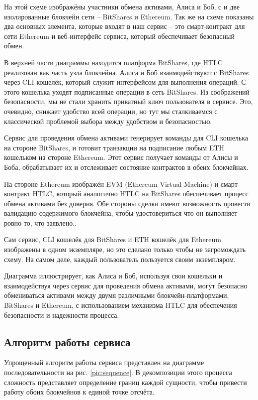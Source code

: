 На этой схеме изображёны участники обмена активами, Алиса и Боб, с и две изолированные блокчейн сети -- BitShares и Ethereum. Так же на схеме показаны два основных элемента, которые входят в наш сервис -- это смарт-контракт для сети Ethereum и веб-интерфейс сервиса, который обеспечивает безопасный обмен.

В верхней части диаграммы находится платформа BitShares, где HTLC реализован как часть узла блокчейна. Алиса и Боб взаимодействуют с BitShares через CLI кошелёк, который служит интерфейсом для выполнения операций. С этого кошелька уходят подписанные операции в сеть BitShares. Из соображений безопасности, мы не стали хранить приватный ключ пользователя в сервисе. Это, очевидно, снижает удобство всей операции, но тут мы сталкиваемся с классической проблемой выбора между удобством и безопасностью.

Сервис для проведения обмена активами генерирует команды для CLI кошелька на стороне BitShares, и готовит транзакции на подписание любым ETH кошельком на стороне Ethereum. Этот сервис получает команды от Алисы и Боба, обрабатывает их и отслеживает состояние контрактов в обеих блокчейнах.

На стороне Ethereum изображён EVM (Ethereum Virtual Machine) и смарт-контракт HTLC, который аналогично HTLC на BitShares обеспечивает процесс обмена активами без доверия. Обе стороны сделки имеют возможность провести валидацию содержимого блокчейна, чтобы удостовериться что он выполняет ровно то, что заявлено..

Сам сервис, CLI кошелёк для BitShares и ETH кошелёк для Ethereum изображены в одном экземпляре, но это сделано только чтобы не загромождать схему. На самом деле, каждый пользователь пользуется своим экземпляром.

Диаграмма иллюстрирует, как Алиса и Боб, используя свои кошельки и взаимодействуя через сервис для проведения обмена активами, могут безопасно обмениваться активами между двумя различными блокчейн-платформами, BitShares и Ethereum, с использованием механизма HTLC для обеспечения безопасности и надежности процесса.

\subsection{Алгоритм работы сервиса}

Упрощенный алгоритм работы сервиса представлен на диаграмме последовательности на рис. \ref{pic:sequence}. В декомпозиции этого процесса сложность представляет определение границ каждой сущности, чтобы привести работу обоих блокчейнов к единой точке отсчёта.


